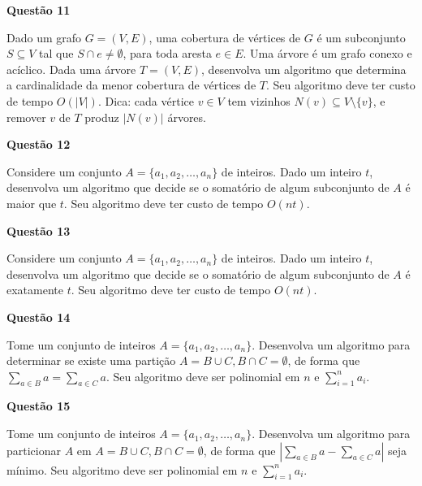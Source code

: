 \documentclass[]{article}
\begin{document}
\vspace{\baselineskip}

\textbf{Questão 11}

Dado um grafo $G = (V, E)$, uma cobertura de vértices de $G$ é um
subconjunto $S \subseteq V$ tal que $S \cap e \neq \emptyset$, para
toda aresta $e \in E$.  Uma árvore é um grafo conexo e acíclico.  Dada
uma árvore $T = (V, E)$, desenvolva um algoritmo que determina a
cardinalidade da menor cobertura de vértices de $T$.  Seu algoritmo
deve ter custo de tempo $O(|V|)$.  Dica: cada vértice $v \in V$ tem
vizinhos $N(v) \subseteq V \setminus \{v\}$, e remover $v$ de $T$
produz $|N(v)|$ árvores.

\vspace{\baselineskip}

\textbf{Questão 12}

Considere um conjunto $A = \{a_1, a_2, \dots, a_n\}$ de inteiros.
Dado um inteiro $t$, desenvolva um algoritmo que decide se o somatório
de algum subconjunto de $A$ é maior que $t$.  Seu algoritmo deve ter
custo de tempo $O(nt)$.

\vspace{\baselineskip}

\textbf{Questão 13}

Considere um conjunto $A = \{a_1, a_2, \dots, a_n\}$ de inteiros.
Dado um inteiro $t$, desenvolva um algoritmo que decide se o somatório
de algum subconjunto de $A$ é exatamente $t$.  Seu algoritmo deve ter
custo de tempo $O(nt)$.

\vspace{\baselineskip}

\textbf{Questão 14}

Tome um conjunto de inteiros $A = \{a_1, a_2, \dots, a_n\}$.
Desenvolva um algoritmo para determinar se existe uma partição
$A = B \cup C, B \cap C = \emptyset$, de forma que
$\sum_{a \in B} a = \sum_{a \in C} a$.  Seu algoritmo deve ser
polinomial em $n$ e $\sum_{i = 1}^n a_i$.

\vspace{\baselineskip}

\textbf{Questão 15}

Tome um conjunto de inteiros $A = \{a_1, a_2, \dots, a_n\}$.
Desenvolva um algoritmo para particionar $A$ em
$A = B \cup C, B \cap C = \emptyset$, de forma que
$|\sum_{a \in B} a - \sum_{a \in C} a|$ seja mínimo.  Seu algoritmo
deve ser polinomial em $n$ e $\sum_{i = 1}^n a_i$.

\vspace{\baselineskip}
\end{document}
